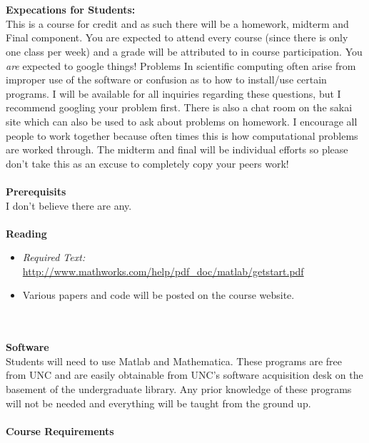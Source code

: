 \documentclass[11pt]{article}
\begin{document}
\ \\
\ \\


{\bf Expecations for Students:}\\

This is a course for credit and as such there will be a homework, midterm and Final component. You are expected to attend every course (since there is only one class per week) and a grade will be attributed to in course participation. You \textit{are} expected to google things! Problems In scientific computing often arise from improper use of the software or confusion as to how to install/use certain programs. I will be available for all inquiries regarding these questions, but I recommend googling your problem first. There is also a chat room on the sakai site which can also be used to ask about problems on homework. I encourage all people to work together because often times this is how computational problems are worked through. The midterm and final will be individual efforts so please don't take this as an excuse to completely copy your peers work! 
\ \\ 
\ \\

{\bf Prerequisits}\\
I don't believe there are any.
\ \\
\ \\

{\bf Reading}
\begin{itemize}
\item \textit{Required Text:} \url{http://www.mathworks.com/help/pdf_doc/matlab/getstart.pdf}
\item Various papers and code will be posted on the course website.
\end{itemize}

\ \\
\ \\

{\bf Software}\\
Students will need to use Matlab and Mathematica. These programs are free from UNC and are easily obtainable from UNC's software acquisition desk on the basement of the undergraduate library. Any prior knowledge of these programs will not be needed and everything will be taught from the ground up.
\ \\
\ \\

{\bf Course Requirements}\\
\end{document}
